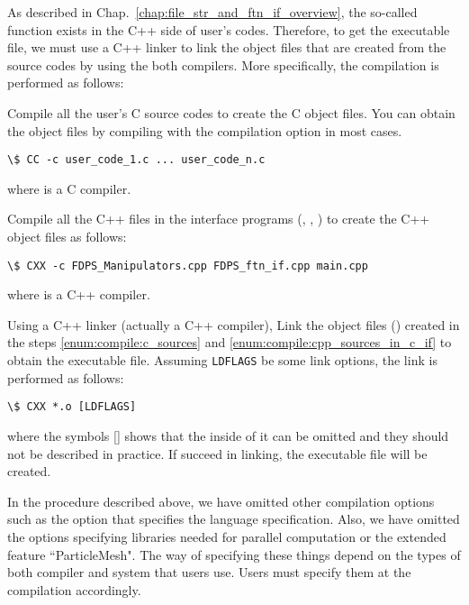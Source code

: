As described in Chap.~\ref{chap:file_str_and_ftn_if_overview}, the so-called  function exists in the C++ side of user's codes. Therefore, to get the executable file, we must use a C++ linker to link the object files that are created from the source codes by using the both compilers. More specifically, the compilation is performed as follows:
\begin{enumerate}[leftmargin=*,label={[\arabic*]}]
 Compile all the user's C source codes to create the C object files. You can obtain the object files by compiling with the compilation option  in most cases.
\begin{Verbatim}[commandchars=\\\{\}]
\$ CC -c user_code_1.c ... user_code_n.c
\end{Verbatim}
where  is a C compiler.
\label{enum:compile:c_sources}

 Compile all the C++ files in the interface programs (, , ) to create the C++ object files as follows:
\begin{Verbatim}[commandchars=\\\{\}]
\$ CXX -c FDPS_Manipulators.cpp FDPS_ftn_if.cpp main.cpp
\end{Verbatim}
where  is a C++ compiler.
\label{enum:compile:cpp_sources_in_c_if}

 Using a C++ linker (actually a C++ compiler), Link the object files () created in the steps \ref{enum:compile:c_sources} and \ref{enum:compile:cpp_sources_in_c_if} to obtain the executable file. Assuming \verb|LDFLAGS| be some link options, the link is performed as follows:
\begin{Verbatim}[commandchars=\\\{\}]
\$ CXX *.o [LDFLAGS]
\end{Verbatim}
where the symbols [] shows that the inside of it can be omitted and they should not be described in practice. If succeed in linking, the executable file will be created.
\end{enumerate}

In the procedure described above, we have omitted other compilation options such as the option that specifies the language specification. Also, we have omitted the options specifying libraries needed for parallel computation or the extended feature ``ParticleMesh". The way of specifying these things depend on the types of both compiler and system that users use. Users must specify them at the compilation accordingly.


